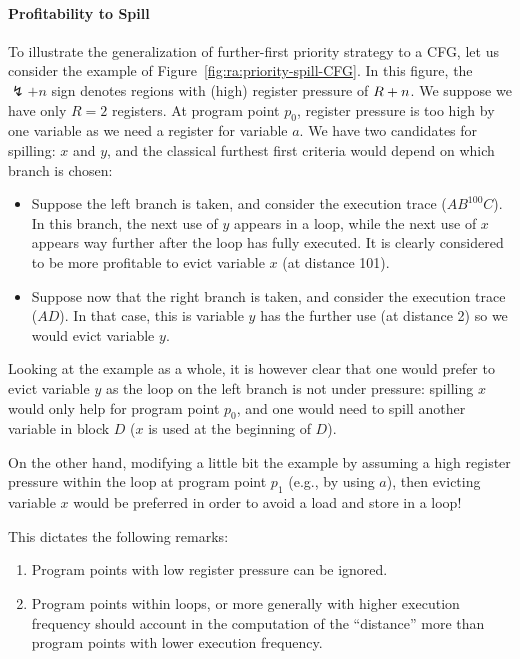 {\paragraph{Profitability to Spill}
To illustrate the generalization of further-first priority strategy to a CFG, let us consider the example of Figure~\ref{fig:ra:priority-spill-CFG}.
In this figure, the $\lightning +n$ sign denotes regions with (high) register pressure of $R+n$.
We suppose we have only $R=2$ registers. At program point $p_0$, register pressure is too high by one variable as we need a register for variable $a$.
We have two candidates for spilling: $x$ and $y$, and the classical furthest first criteria would depend on which branch is chosen:

\begin{itemize}
  \item Suppose the left branch is taken, and consider the execution trace ($AB^{100}C$).
  In this branch, the next use of $y$ appears in a loop, while the next use of $x$ appears way further after the loop has fully executed. 
  It is clearly considered to be more profitable to evict variable $x$ (at distance 101).


\item Suppose now that the right branch is taken, and consider the execution trace ($AD$).
  In that case, this is variable $y$ has the further use (at distance 2) so we would evict variable $y$.

\end{itemize}

Looking at the example as a whole, it is however clear that one would prefer to evict variable $y$ as the loop on the left branch is not under pressure: spilling $x$ would only help for program point $p_0$, and one would need to spill another variable in block $D$ ($x$ is used at the beginning of $D$).

On the other hand, modifying a little bit the example by assuming a high register pressure within the loop at program point $p_1$ (e.g., by using $a$), then evicting variable $x$ would be preferred in order to avoid a load and store in a loop!



This dictates the following remarks:
\begin{enumerate}
  \item Program points with low register pressure can be ignored.
  \item Program points within loops, or more generally with higher execution frequency should account in the computation of the ``distance'' more than program points with lower execution frequency.
\end{enumerate}

}
